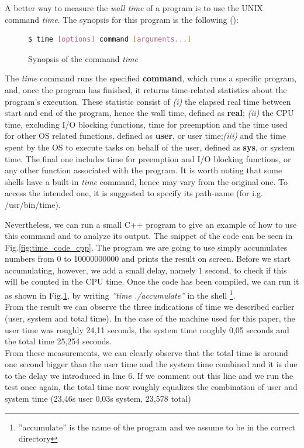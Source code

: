 A better way to measure the \textit{wall time} of a program is to use the UNIX command \textit{time}. The synopsis for this program is the following (\cite{linux_commands}):\\
\begin{figure}[h]
\begin{lstlisting}[language=bash]
   $ time [options] command [arguments...]
\end{lstlisting}
\caption{Synopsis of the command \textit{time}}
\label{fig:time_code}
\end{figure}


The \textit{time} command runs the specified \textbf{command}, which runs a specific program, and, once the program has finished, it returns time-related statistics about the program's execution.
These statistic consist of \textit{(i)} the elapsed real time between start and end of the program, hence the wall time, defined as \textbf{real}; \textit{(ii)} the CPU time, excluding I/O blocking functions, time for preemption and the time used for other OS related functions, defined as \textbf{user}, or user time;\textit{(iii)} and the time spent by the OS to execute tasks on behalf of the user, defined as \textbf{sys}, or system time. The final one includes time for preemption and I/O blocking functions, or any other function associated with the program. \cite{Stewart2001MeasuringET}
It is worth noting that some shells have a built-in \textit{time} command, hence may vary from the original one. To access the intended one, it is suggested to specify its path-name (for i.g. /usr/bin/time). \cite{linux_commands} 

Nevertheless, we can run a small C++ program to give an example of how to use this command and to analyze its output. The snippet of the code can be seen in Fig.\ref{fig:time_code_cpp}. The program we are going to use simply accumulates numbers from 0  to 10000000000 and prints the result on screen. Before we start accumulating, however, we add a small delay, namely 1 second, to check if this will be counted in the CPU time. Once the code has been compiled, we can run it as shown in Fig.\ref{fig:time_code}, by writing \textit{''time ./accumulate''} in the shell \footnote{''accumulate'' is the name of the program and we assume to be in the correct directory}.\\
From the result we can observe the three indications of time we described earlier (user, system and total time).  In the case of the machine used for this paper, the user time was roughly 24,11 seconds, the system time roughly 0,05 seconds and the total time 25,254 seconds. \\
From these measurements, we can clearly observe that the total time is around one second bigger than the user time and the system time combined and it is due to the delay we introduced in line 6. If we comment out this line and we run the test once again, the total time now roughly equalizes the combination of user and system time (23,46s user 0,03s system, 23,578 total)


